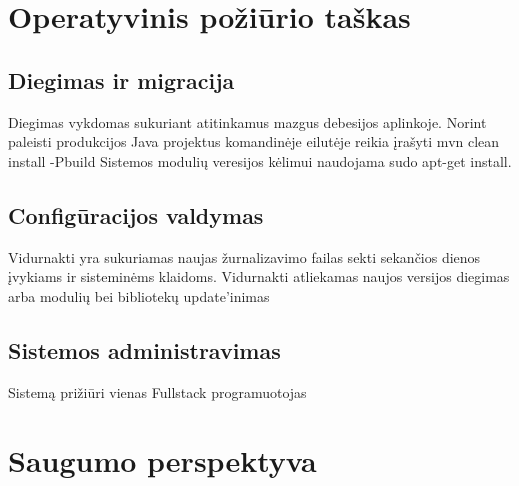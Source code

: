 \documentclass{VUMIFPSmagistrinis}
\begin{document}
		\section{Operatyvinis požiūrio taškas}
			\subsection{Diegimas ir migracija}
				Diegimas vykdomas sukuriant atitinkamus mazgus debesijos aplinkoje.
				Norint paleisti produkcijos Java projektus komandinėje eilutėje reikia įrašyti mvn clean install -Pbuild
				Sistemos modulių veresijos kėlimui naudojama sudo apt-get install.
				
			\subsection{Configūracijos valdymas}
				Vidurnakti yra sukuriamas naujas žurnalizavimo failas sekti sekančios dienos įvykiams ir sisteminėms klaidoms.
				Vidurnakti atliekamas naujos versijos diegimas arba modulių bei bibliotekų update'inimas
			\subsection{Sistemos administravimas}
				Sistemą prižiūri vienas Fullstack programuotojas
		\section{Saugumo perspektyva}
\end{document}
